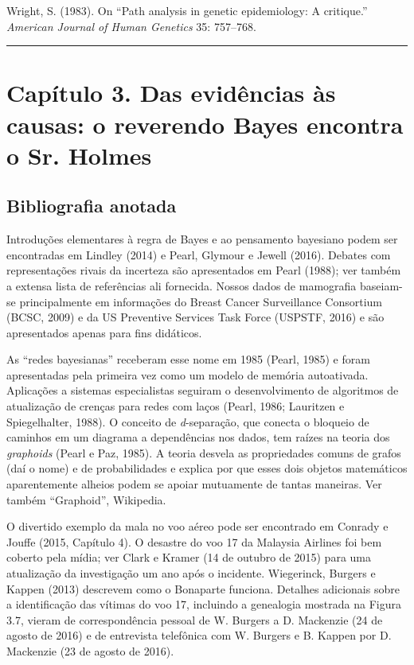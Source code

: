 \documentclass[11pt,a5paper,twoside]{book}
\begin{document}
Wright, S. (1983). On “Path analysis in genetic epidemiology: A critique.” \textit{American Journal of Human Genetics} 35: 757–768.

\vspace{1em}\hrule\vspace{1em}
\section{Capítulo 3. Das evidências às causas: o reverendo Bayes encontra o Sr. Holmes}
\subsection{Bibliografia anotada}
Introduções elementares à regra de Bayes e ao pensamento bayesiano podem ser encontradas em Lindley (2014) e Pearl, Glymour e Jewell (2016). Debates com representações rivais da incerteza são apresentados em Pearl (1988); ver também a extensa lista de referências ali fornecida. Nossos dados de mamografia baseiam-se principalmente em informações do Breast Cancer Surveillance Consortium (BCSC, 2009) e da US Preventive Services Task Force (USPSTF, 2016) e são apresentados apenas para fins didáticos.

As “redes bayesianas” receberam esse nome em 1985 (Pearl, 1985) e foram apresentadas pela primeira vez como um modelo de memória autoativada. Aplicações a sistemas especialistas seguiram o desenvolvimento de algoritmos de atualização de crenças para redes com laços (Pearl, 1986; Lauritzen e Spiegelhalter, 1988). O conceito de \textit{d}-separação, que conecta o bloqueio de caminhos em um diagrama a dependências nos dados, tem raízes na teoria dos \textit{graphoids} (Pearl e Paz, 1985). A teoria desvela as propriedades comuns de grafos (daí o nome) e de probabilidades e explica por que esses dois objetos matemáticos aparentemente alheios podem se apoiar mutuamente de tantas maneiras. Ver também “Graphoid”, Wikipedia.

O divertido exemplo da mala no voo aéreo pode ser encontrado em Conrady e Jouffe (2015, Capítulo 4). O desastre do voo 17 da Malaysia Airlines foi bem coberto pela mídia; ver Clark e Kramer (14 de outubro de 2015) para uma atualização da investigação um ano após o incidente. Wiegerinck, Burgers e Kappen (2013) descrevem como o Bonaparte funciona. Detalhes adicionais sobre a identificação das vítimas do voo 17, incluindo a genealogia mostrada na Figura 3.7, vieram de correspondência pessoal de W. Burgers a D. Mackenzie (24 de agosto de 2016) e de entrevista telefônica com W. Burgers e B. Kappen por D. Mackenzie (23 de agosto de 2016).
\end{document}
